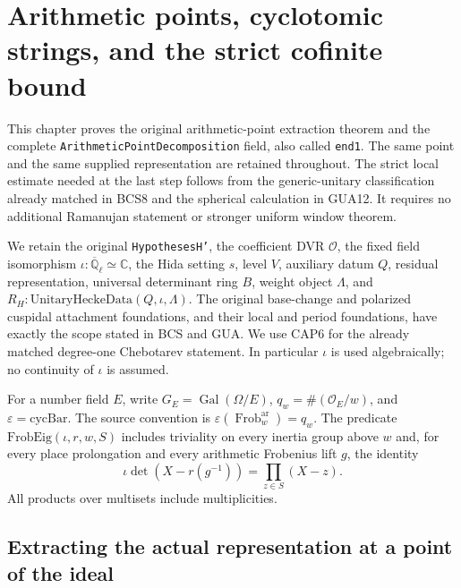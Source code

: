 \documentclass[11pt,a4paper]{article}
\numberwithin{equation}{section}
\theoremstyle{remark}\newtheorem{remark}[theorem]{Remark}
\begin{document}
\section{Arithmetic points, cyclotomic strings, and the strict cofinite bound}
\label{sec:hida-decomposition-v45}

This chapter proves the original arithmetic-point extraction theorem and
the complete \texttt{Arithmetic\allowbreak Point\allowbreak Decomposition} field, also called
\texttt{end1}.  The same point and the same supplied representation are
retained throughout.  The strict local estimate needed at the last step
follows from the generic-unitary classification already matched in BCS8
and the spherical calculation in GUA12.  It requires no additional
Ramanujan statement or stronger uniform window theorem.

We retain the original \texttt{HypothesesH'}, the coefficient DVR
\(\mathcal O\), the fixed field isomorphism
\(\iota:\overline{\mathbb Q}_\ell\simeq\mathbb C\), the Hida setting
\(s\), level \(V\), auxiliary datum \(Q\), residual representation,
universal determinant ring \(B\), weight object \(\Lambda\), and
\(R_H:\mathrm{UnitaryHeckeData}(Q,\iota,\Lambda)\).
The original base-change and polarized cuspidal attachment foundations,
and their local and period foundations, have exactly the scope stated
in BCS and GUA.  We use CAP6 for the already matched degree-one
Chebotarev statement.  In particular \(\iota\) is used algebraically;
no continuity of \(\iota\) is assumed.

For a number field \(E\), write \(G_E=\operatorname{Gal}(\Omega/E)\),
\(q_w=\#(\mathcal O_E/w)\), and \(\varepsilon=\mathrm{cycBar}\).
The source convention is
\(\varepsilon(\operatorname{Frob}^{\mathrm{ar}}_w)=q_w\).
The predicate \(\mathrm{FrobEig}(\iota,r,w,S)\) includes triviality
on every inertia group above \(w\) and, for every place prolongation
and every arithmetic Frobenius lift \(g\), the identity
\[
 \iota\det(X-r(g^{-1}))=\prod_{z\in S}(X-z).
 \tag{HED.1}
\]
All products over multisets include multiplicities.

\subsection{Extracting the actual representation at a point of the ideal}

\end{document}

